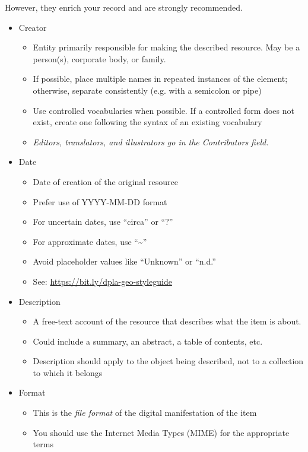 \documentclass[11pt]{article}
\begin{document}
However, they enrich your record and are strongly recommended.
\begin{itemize}
\item Creator
\label{sec:orgccb9fd5}
\begin{itemize}
\item Entity primarily responsible for making the described resource. May be a person(s), corporate body, or family.
\item If possible, place multiple names in repeated instances of the element; otherwise, separate consistently (e.g. with a semicolon or pipe)
\item Use controlled vocabularies when possible. If a controlled form does not exist, create one following the syntax of an existing vocabulary
\item \emph{Editors, translators, and illustrators go in the Contributors field.}
\end{itemize}
\item Date
\label{sec:org9418262}
\begin{itemize}
\item Date of creation of the original resource
\item Prefer use of YYYY-MM-DD format
\item For uncertain dates, use ``circa'' or ``?''
\item For approximate dates, use ``\textasciitilde{}''
\item Avoid placeholder values like ``Unknown'' or ``n.d.''
\item See: \url{https://bit.ly/dpla-geo-styleguide}
\end{itemize}
\item Description
\label{sec:orgeea8cf2}
\begin{itemize}
\item A free-text account of the resource that describes what the item is about.
\item Could include a summary, an abstract, a table of contents, etc.
\item Description should apply to the object being described, not to a collection to which it belongs
\end{itemize}
\item Format
\label{sec:orgeaf734c}
\begin{itemize}
\item This is the \emph{file format} of the digital manifestation of the item
\item You should use the Internet Media Types (MIME) for the appropriate terms

\end{itemize}
\end{itemize}
\end{document}
